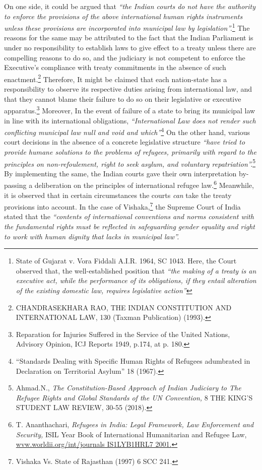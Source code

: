 \begin{multicols}{2}
\noi
On one side, it could be argued that \textit{“the Indian courts do not have the authority to enforce
the provisions of the above international human rights instruments unless these provisions are
incorporated into municipal law by legislation”.}\footnote{State of Gujarat v. Vora Fiddali A.I.R. 1964, SC 1043. Here, the Court observed that, the well-established position that \textit{“the making of a treaty is an executive act, while the performance of its obligations, if they entail alteration of the existing domestic law, requires legislative action”}} The reasons for the same may be attributed
to the fact that the Indian Parliament is under no responsibility to establish laws to give effect
to a treaty unless there are compelling reasons to do so, and the judiciary is not competent to
enforce the Executive's compliance with treaty commitments in the absence of such
enactment.\footnote{CHANDRASEKHARA RAO, THE INDIAN CONSTITUTION AND INTERNATIONAL LAW, 130
(Taxman Publication) (1993).}  Therefore, It might be claimed that each nation-state has a responsibility to
observe its respective duties arising from international law, and that they cannot blame their
failure to do so on their legislative or executive apparatus.\footnote{Reparation for Injuries Suffered in the Service of the United Nations, Advisory Opinion, ICJ Reports 1949, p.174, at p. 180.}  Moreover, In the event of failure
of a state to bring its municipal law in line with its international obligations, \textit{“International Law does not render such conflicting municipal law null and void and which”}\footnote{“Standards Dealing with Specific Human Rights of Refugees adumbrated in Declaration on Territorial Asylum” 18 (1967).}  On the other hand, various court decisions in the absence of a concrete legislative structure \textit{“have tried to provide humane solutions to the problems of refugees, primarily with regard to the principles on non-refoulement, right to seek asylum, and voluntary repatriation”.}\footnote{Ahmad.N., \textit{The Constitution-Based Approach of Indian Judiciary to The Refugee Rights and Global Standards of the UN Convention,} 8 THE KING’S STUDENT LAW REVIEW, 30-55 (2018).} By implementing the same, the Indian courts gave their own interpretation by-passing a deliberation on the
principles of international refugee law.\footnote{T. Ananthachari, \textit{Refugees in India: Legal Framework, Law Enforcement and Security,} ISIL Year Book of International Humanitarian and Refugee Law, \url{wvw.worldii.org/int/journals IS1LYB1HRL7 2001.}} Meanwhile, it is observed that in certain
circumstances the courts \textit{can} take the treaty provisions into account. In the case of Vishaka,\footnote{Vishaka Vs. State of Rajasthan (1997) 6 SCC 241.} the Supreme Court of India stated that the \textit{“contents of international conventions and norms
consistent with the fundamental rights must be reflected in safeguarding gender equality and
right to work with human dignity that lacks in municipal law”.}


\end{multicols}
